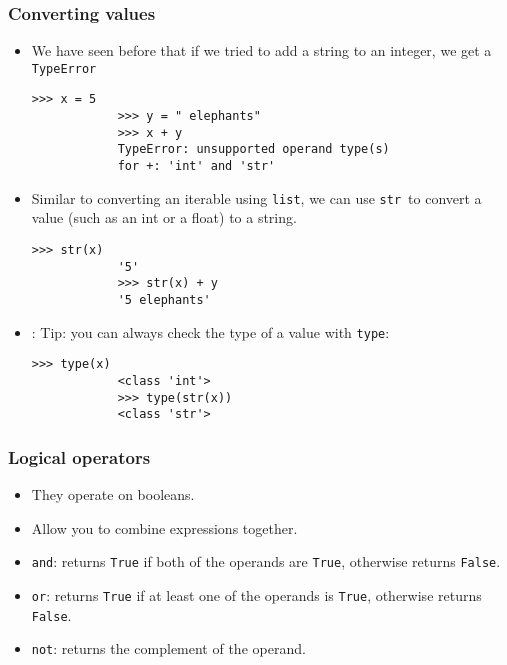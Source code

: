 \documentclass[presentation]{beamer}
\begin{document}
	\begin{frame}[fragile]
		\frametitle{Converting values}
		\begin{itemize}
			\item We have seen before that if we tried to add a string to an integer, we get a \lstinline|TypeError|
			\begin{lstlisting}[xleftmargin=\dimexpr-\leftmargini, basicstyle=\scriptsize\tt]
			>>> x = 5
			>>> y = " elephants"
			>>> x + y
			TypeError: unsupported operand type(s)
			for +: 'int' and 'str'
			\end{lstlisting}
			\pause
			\item Similar to converting an iterable using \lstinline|list|, we can use \lstinline|str|~to convert a value (such as an int or a float) to a string.
			\begin{lstlisting}[xleftmargin=\dimexpr-\leftmargini, basicstyle=\scriptsize\tt]
			>>> str(x)
			'5'
			>>> str(x) + y
			'5 elephants'
			\end{lstlisting}
			
			\item: Tip: you can always check the type of a value with \lstinline|type|:
			\begin{lstlisting}[xleftmargin=\dimexpr-\leftmargini, basicstyle=\scriptsize\tt]
			>>> type(x)
			<class 'int'>
			>>> type(str(x))
			<class 'str'>
			\end{lstlisting}
		
		\end{itemize}
	\end{frame}
	
	\begin{frame}[fragile]
		\frametitle{Logical operators}
		\begin{itemize}
			\item They operate on booleans.
			\item Allow you to combine expressions together.
			\pause
			\item \lstinline|and|: returns \lstinline|True| if both of the operands are \lstinline|True|, otherwise returns \lstinline|False|.
			\item \lstinline|or|: returns \lstinline|True| if at least one of the operands is \lstinline|True|, otherwise returns \lstinline|False|.
			\item \lstinline|not|: returns the complement of the operand.
		\end{itemize}
	\end{frame}
	
\end{document}
